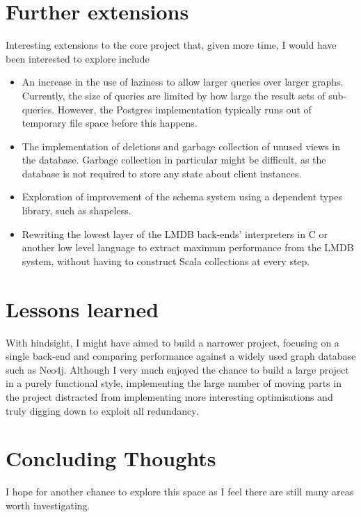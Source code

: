 \documentclass[12pt,a4paper,twoside,openright]{report}
\begin{document}
\section{Further extensions}
Interesting extensions to the core project that, given more time, I would have been interested to explore include
\begin{itemize}
 \item An increase in the use of laziness to allow larger queries over larger graphs. Currently, the size of queries are limited by how large the result sets of sub-queries. However, the Postgres implementation typically runs out of temporary file space before this happens.
 \item The implementation of deletions and garbage collection of unused views in the database. Garbage collection in particular might be difficult, as the database is not required to store any state about client instances.
 \item Exploration of  improvement of the schema system using a dependent types library, such as shapeless.
 \item Rewriting the lowest layer of the LMDB back-ends' interpreters in C or another low level language to extract maximum performance from the LMDB system, without having to construct Scala collections at every step.
\end{itemize}

\section{Lessons learned}
	With hindsight, I might have aimed to build a narrower project, focusing on a single back-end and comparing  performance against a widely used graph database such as Neo4j. Although I very much enjoyed the chance to build a large project in a purely functional style, implementing the large number of moving parts in the project distracted from implementing more interesting optimisations and truly digging down to exploit all redundancy.

\section{Concluding Thoughts}
I hope for another chance to explore this space as I feel there are still many areas worth investigating.





\end{document}
